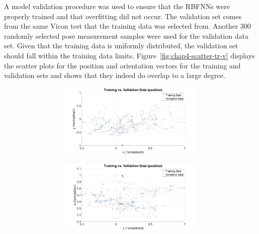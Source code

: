 A model validation procedure was used to ensure that the RBFNNs were properly trained and that overfitting did not occur. The validation set comes from the same Vicon test that the training data was selected from. Another 300 randomly selected pose measurement samples were used for the validation data set. Given that the training data is uniformly distributed, the validation set should fall within the training data limits. Figure~\ref{fig:chap4-scatter-tr-v} displays the scatter plots for the position and orientation vectors for the training and validation sets and shows that they indeed do overlap to a large degree. 

\begin{figure}
  \centering
  \begin{subfigure}{\textwidth}
    \begin{subfigure}{0.48\textwidth}
      \includegraphics[clip, trim = 80 0 80 0, width=\textwidth]{figures/chapter4/tr_v_v_xy}
    \end{subfigure}
    \begin{subfigure}{0.48\textwidth}
      \includegraphics[clip, trim = 80 0 80 0, width=\textwidth]{figures/chapter4/tr_v_v_xz}
    \end{subfigure}
    \caption{}
  \end{subfigure}

\end{figure}
